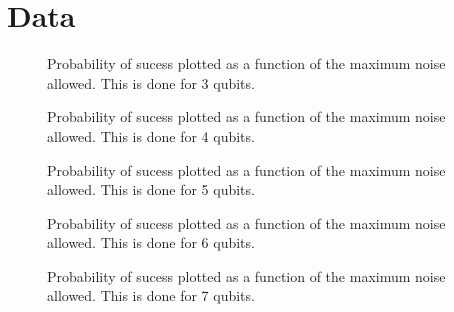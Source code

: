 \chapter{Data}
\label{chap:data}
%



\begin{figure}
\begin{center}
\end{center}
\caption{Probability of sucess plotted as a function of the maximum noise allowed.
This is done for 3 qubits.}
\end{figure}

\pagebreak

\begin{figure}
\begin{center}
\end{center}
\caption{Probability of sucess plotted as a function of the maximum noise allowed.
This is done for 4 qubits.}
\end{figure}

\pagebreak

\begin{figure}
\begin{center}
\end{center}
\caption{Probability of sucess plotted as a function of the maximum noise allowed.
This is done for 5 qubits.}
\end{figure}

\pagebreak

\begin{figure}
\begin{center}
\end{center}
\caption{Probability of sucess plotted as a function of the maximum noise allowed.
This is done for 6 qubits.}
\end{figure}

\pagebreak

\begin{figure}
\begin{center}
\end{center}
\caption{Probability of sucess plotted as a function of the maximum noise allowed.
This is done for 7 qubits.}
\end{figure}


